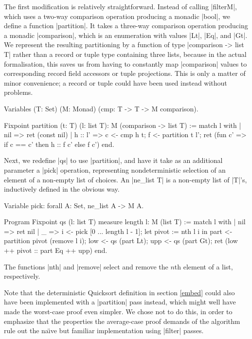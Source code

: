 \documentclass[runningheads]{llncs}
\begin{document}
The first modification is relatively straightforward. Instead of calling
|filterM|, which uses a two-way comparison operation producing a monadic |bool|, we
define a function |partition|. It takes a three-way comparison operation producing a monadic |comparison|, which is an enumeration with values |Lt|, |Eq|, and |Gt|. We represent the resulting partitioning by a function of type |comparison -> list T| rather than a record or tuple type containing three lists, because in the actual formalisation, this saves us from having to constantly map |comparison| values to corresponding record field accessors or tuple projections. This is only a matter of minor convenience; a record or tuple could have been used instead without problems.

\begin{code}
  Variables (T: Set) (M: Monad) (cmp: T -> T -> M comparison).

  Fixpoint partition (t: T) (l: list T): M (comparison -> list T) :=
    match l with
    | nil => ret (const nil)
    | h :: l' =>
        c <- cmp h t; f <- partition t l';
        ret (fun c' => if c == c' then h :: f c' else f c')
    end.
\end{code}

Next, we redefine |qs| to use |partition|, and have it take as an additional parameter a |pick| operation, representing nondeterministic selection of an element of a non-empty list of choices. An |ne_list T| is a non-empty list of |T|'s, inductively defined in the obvious way. 

\begin{code}
  Variable pick: forall A: Set, ne_list A -> M A.

  Program Fixpoint qs (l: list T) {measure length l}: M (list T) :=
    match l with
    | nil => ret nil
    | _ =>
        i <- pick [0 ... length l - 1];
        let pivot := nth l i in
        part <- partition pivot (remove l i);
        low <- qs (part Lt);
        upp <- qs (part Gt);
        ret (low ++ pivot :: part Eq ++ upp)
    end.
\end{code}
The functions |nth| and |remove| select and remove the $n$th element of a list, respectively.

Note that the deterministic Quicksort definition in section \ref{embed} could also have been implemented with a |partition| pass instead, which might well have made the worst-case proof even simpler. We chose not to do this, in order to emphasize that the properties the average-case proof demands of the algorithm rule out the na{\"\i}ve but familiar implementation using |filter| passes.
\end{document}
